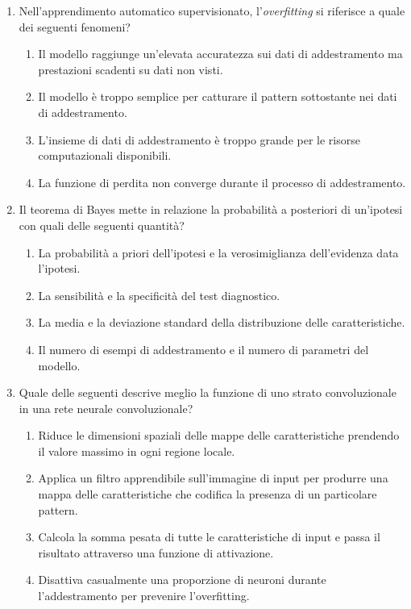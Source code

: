 \begin{enumerate}
    \item \label{ch3:q4} Nell'apprendimento automatico supervisionato, l'\textit{overfitting} si riferisce a quale dei seguenti fenomeni?
    \begin{enumerate}[label=\Alph*.]
        \item Il modello raggiunge un'elevata accuratezza sui dati di addestramento ma prestazioni scadenti su dati non visti.
        \item Il modello è troppo semplice per catturare il pattern sottostante nei dati di addestramento.
        \item L'insieme di dati di addestramento è troppo grande per le risorse computazionali disponibili.
        \item La funzione di perdita non converge durante il processo di addestramento.
    \end{enumerate}

    \item \label{ch3:q5} Il teorema di Bayes mette in relazione la probabilità a posteriori di un'ipotesi con quali delle seguenti quantità?
    \begin{enumerate}[label=\Alph*.]
        \item La probabilità a priori dell'ipotesi e la verosimiglianza dell'evidenza data l'ipotesi.
        \item La sensibilità e la specificità del test diagnostico.
        \item La media e la deviazione standard della distribuzione delle caratteristiche.
        \item Il numero di esempi di addestramento e il numero di parametri del modello.
    \end{enumerate}

    \item \label{ch3:q6} Quale delle seguenti descrive meglio la funzione di uno strato convoluzionale in una rete neurale convoluzionale?
    \begin{enumerate}[label=\Alph*.]
        \item Riduce le dimensioni spaziali delle mappe delle caratteristiche prendendo il valore massimo in ogni regione locale.
        \item Applica un filtro apprendibile sull'immagine di input per produrre una mappa delle caratteristiche che codifica la presenza di un particolare pattern.
        \item Calcola la somma pesata di tutte le caratteristiche di input e passa il risultato attraverso una funzione di attivazione.
        \item Disattiva casualmente una proporzione di neuroni durante l'addestramento per prevenire l'overfitting.
    \end{enumerate}


\end{enumerate}
